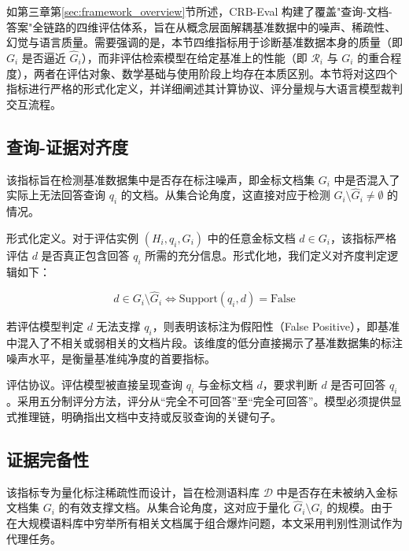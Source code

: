 如第三章第\ref{sec:framework_overview}节所述，CRB-Eval 构建了覆盖"查询-文档-答案"全链路的四维评估体系，旨在从概念层面解耦基准数据中的噪声、稀疏性、幻觉与语言质量。需要强调的是，本节四维指标用于诊断基准数据本身的质量（即 $G_i$ 是否逼近 $\hat{G}_i$），而非评估检索模型在给定基准上的性能（即 $\mathcal{R}_i$ 与 $G_i$ 的重合程度），两者在评估对象、数学基础与使用阶段上均存在本质区别。本节将对这四个指标进行严格的形式化定义，并详细阐述其计算协议、评分量规与大语言模型裁判交互流程。

\subsection{查询-证据对齐度}



该指标旨在检测基准数据集中是否存在标注噪声，即金标文档集 $G_i$ 中是否混入了实际上无法回答查询 $q_i$ 的文档。从集合论角度，这直接对应于检测 $G_i \setminus \hat{G}_i \neq \emptyset$ 的情况。



形式化定义。对于评估实例 $(H_i, q_i, G_i)$ 中的任意金标文档 $d \in G_i$，该指标严格评估 $d$ 是否真正包含回答 $q_i$ 所需的充分信息。形式化地，我们定义对齐度判定逻辑如下：

\begin{equation}
    d \in G_i \setminus \hat{G}_i \iff \text{Support}(q_i, d) = \text{False}
\end{equation}

若评估模型判定 $d$ 无法支撑 $q_i$，则表明该标注为假阳性（False Positive），即基准中混入了不相关或弱相关的文档片段。该维度的低分直接揭示了基准数据集的标注噪声水平，是衡量基准纯净度的首要指标。



评估协议。评估模型被直接呈现查询 $q_i$ 与金标文档 $d$，要求判断 $d$ 是否可回答 $q_i$。采用五分制评分方法，评分从“完全不可回答”至“完全可回答”。模型必须提供显式推理链，明确指出文档中支持或反驳查询的关键句子。



\subsection{证据完备性}



该指标专为量化标注稀疏性而设计，旨在检测语料库 $\mathcal{D}$ 中是否存在未被纳入金标文档集 $G_i$ 的有效支撑文档。从集合论角度，这对应于量化 $\hat{G}_i \setminus G_i$ 的规模。由于在大规模语料库中穷举所有相关文档属于组合爆炸问题，本文采用判别性测试作为代理任务。



